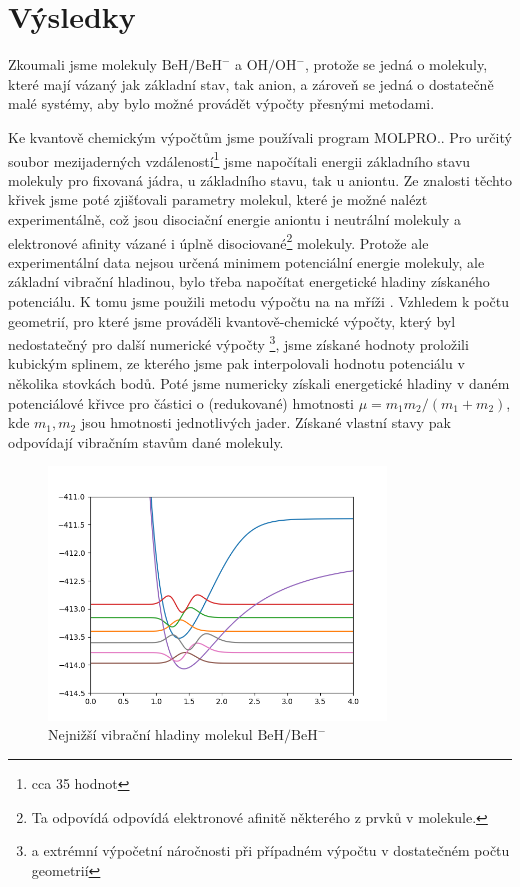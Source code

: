 \chapter{Výsledky}
Zkoumali jsme molekuly $\mathrm{BeH/BeH^-}$ a $\mathrm{OH/OH^-}$, protože se jedná o 
molekuly, které mají vázaný jak základní stav, tak anion, a zároveň se jedná o 
dostatečně malé systémy, aby bylo možné provádět výpočty přesnými metodami.

Ke kvantově chemickým výpočtům jsme používali program MOLPRO.\cite{MOLPRO-WIREs}\cite{MOLPRO}. 
Pro určitý soubor mezijaderných vzdáleností\footnote{cca 35 hodnot} jsme napočítali 
energii základního stavu molekuly pro fixovaná jádra, u základního stavu, tak u 
aniontu. Ze znalosti těchto křivek jsme poté zjišťovali parametry molekul, které je 
možné nalézt experimentálně, což jsou disociační energie aniontu i neutrální molekuly a 
elektronové afinity vázané i úplně disociované\footnote{Ta odpovídá odpovídá 
elektronové afinitě některého z prvků v molekule.} molekuly. Protože ale experimentální 
data nejsou určená minimem potenciální energie molekuly, ale základní vibrační 
hladinou, bylo třeba napočítat energetické hladiny získaného potenciálu. K tomu jsme 
použili \? metodu výpočtu na na mříži \? . Vzhledem k počtu geometrií, pro které jsme 
prováděli kvantově-chemické výpočty, který byl nedostatečný pro další numerické výpočty
\footnote{a extrémní výpočetní náročnosti při případném výpočtu v dostatečném počtu 
geometrií}, jsme získané hodnoty proložili kubickým splinem, ze kterého jsme pak 
interpolovali hodnotu potenciálu v několika stovkách bodů. Poté jsme numericky získali 
energetické hladiny v daném potenciálové křivce pro částici o (redukované) hmotnosti $
\mu = m_1m_2/(m_1+m_2)$, kde $m_1,m_2$ jsou hmotnosti jednotlivých jader. Získané 
vlastní stavy pak odpovídají vibračním stavům dané molekuly.

\begin{figure}
\centering
\includegraphics[width=0.8\textwidth]{../img/VibrStavy1.png}
\caption{Nejnižší vibrační hladiny molekul $\mathrm{BeH/BeH^-}$}
\label{Vibr1}
\end{figure}





